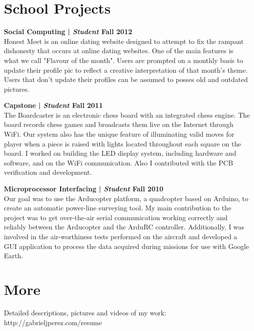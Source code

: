 \documentclass[margin,line]{res}
\begin{document}
\begin{resume}
\section{\sc School Projects}

{\bf Social Computing | {\em Student} \hfill {\bf Fall 2012 \\} }
\vspace{-.01cm}
Honest Meet is an online dating website designed to attempt to fix the rampant dishonesty that occurs at online dating websites. One of the main features is what we call "Flavour of the month". Users are prompted on a monthly basis to update their profile pic to reflect a creative interpretation of that month's theme. Users that don't update their profiles can be assumed to posses old and outdated pictures.

{\bf Capstone | {\em Student} \hfill {\bf Fall 2011 \\} }
\vspace{-.01cm}
The Boardcaster is an electronic chess board with an integrated chess engine. The board records chess games and broadcasts them live on the Internet through WiFi. Our system also has the unique feature of illuminating valid moves for player when a piece is raised with lights located throughout each square on the board. I worked on building the LED display system, including hardware and software, and on the WiFi communication. Also I contributed with the PCB verification and development.

{\bf Microprocessor Interfacing | {\em Student} \hfill {\bf Fall 2010 \\} }
\vspace{-.01cm}
Our goal was to use the Arducopter platform, a quadcopter based on Arduino, to create an automatic power-line surveying tool. My main contribution to the project was to get over-the-air serial communication working correctly and reliably between the Arducopter and the ArduRC controller. Additionally, I was involved in the air-worthiness tests performed on the aircraft and developed a GUI application to process the data acquired during missions for use with Google Earth.

\section{\sc More}
Detailed  descriptions, pictures and videos of my work: http://gabrieljperez.com/resume    \\

\end{resume}
\end{document}
